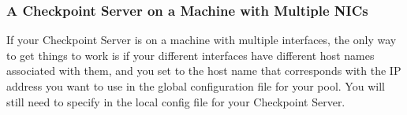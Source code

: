 \subsubsection{A Checkpoint Server on a Machine with Multiple NICs}

If your Checkpoint Server is on a machine with multiple interfaces,
the only way to get things to work is if your different interfaces
have different host names associated with them, and you set
 to the host name that corresponds with the
IP address you want to use in the global configuration file for your pool.
You will still need to specify  in the local
config file for your Checkpoint Server.

